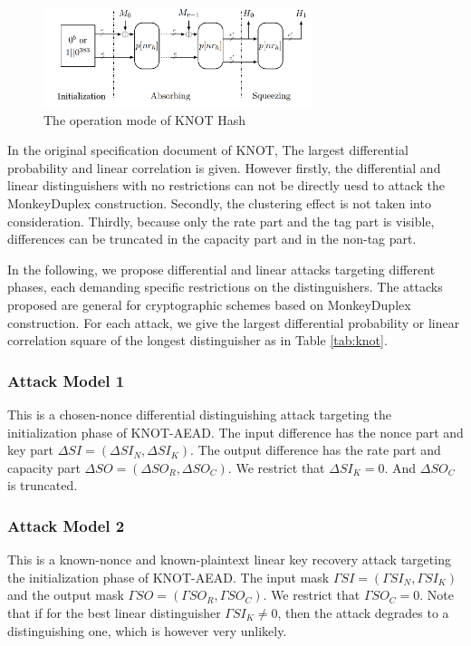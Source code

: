 \begin{figure}
	\centering
	\includegraphics[width=0.7\textwidth]{fig/mode_hash.PNG}
	\caption{The operation mode of KNOT Hash} \label{fig:mode_hash}
\end{figure}

In the original specification document of KNOT, The largest differential probability and linear correlation is given. However firstly, the differential and linear distinguishers with no restrictions can not be directly uesd to attack the MonkeyDuplex construction. Secondly, the clustering effect is not taken into consideration. Thirdly, because only the rate part and the tag part is visible, differences can be truncated in the capacity part and in the non-tag part. 

In the following, we propose differential and linear attacks targeting different phases, each demanding specific restrictions on the distinguishers. The attacks proposed are general for cryptographic schemes based on MonkeyDuplex construction. For each attack, we give the largest differential probability or linear correlation square of the longest distinguisher as in Table \ref{tab:knot}. 

\subsubsection{Attack Model 1}
This is a chosen-nonce differential distinguishing attack targeting the initialization phase of KNOT-AEAD. The input difference has the nonce part and key part $\Delta SI=(\Delta SI_N,\Delta SI_K)$. The output difference has the rate part and capacity part $\Delta SO=(\Delta SO_R,\Delta SO_C)$. We restrict that $\Delta SI_K=0$. And $\Delta SO_C$ is truncated. 

\subsubsection{Attack Model 2}
This is a known-nonce and known-plaintext linear key recovery attack targeting the initialization phase of KNOT-AEAD. The input mask $\Gamma SI=(\Gamma SI_N,\Gamma SI_K)$ and the output mask $\Gamma SO=(\Gamma SO_R,\Gamma SO_C)$. We restrict that $\Gamma SO_C=0$. Note that if for the best linear distinguisher $\Gamma SI_K\neq 0$, then the attack degrades to a distinguishing one, which is however very unlikely. 

